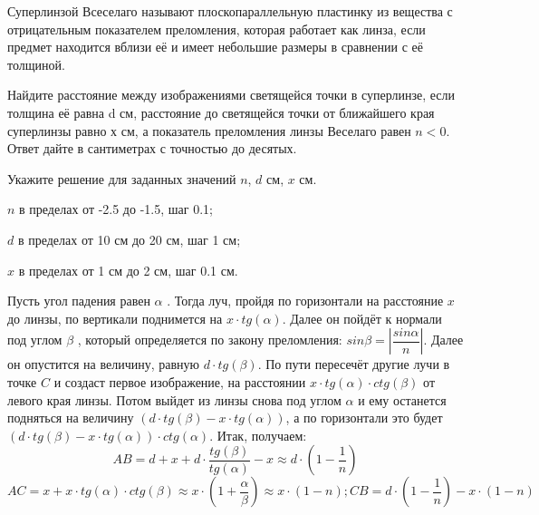 Суперлинзой Всеселаго называют плоскопараллельную
пластинку из вещества с отрицательным показателем преломления, которая работает
как линза, если предмет находится вблизи её и имеет небольшие размеры в
сравнении с её толщиной.

Найдите расстояние между изображениями светящейся
точки в суперлинзе, если толщина её равна d см, расстояние до светящейся точки  от ближайшего края суперлинзы равно х см, а показатель преломления линзы Веселаго равен $n < 0$. Ответ дайте в сантиметрах с точностью до десятых.

Укажите решение для заданных значений $n$, $d$ см, $x$ см.

\paramSection

$n$ в пределах от -2.5 до -1.5, шаг 0.1;    

$d$ в пределах от 10 см до 20 см, шаг 1 см;  

$x$ в пределах от 1 см до 2 см, шаг 0.1 см.

\soultionSection

Пусть угол падения равен $\alpha$ . Тогда луч, пройдя по горизонтали на расстояние $x$ до линзы, 
по вертикали поднимется на $x \cdot tg(\alpha )$. Далее он пойдёт к нормали под углом  $\beta$ , который 
определяется по закону преломления: $sin\beta =\left|\dfrac{sin\alpha}{n}\right|$. Далее он опустится на 
величину, равную $d \cdot  tg( \beta )$. По пути пересечёт другие лучи в точке $C$ и создаст первое изображение,  
на расстоянии  $x \cdot tg(\alpha ) \cdot ctg( \beta )$  от левого края линзы. Потом выйдет из линзы снова под 
углом $\alpha$  и ему останется подняться на величину $(d \cdot  tg( \beta ) - x \cdot tg(\alpha ) )$, а по 
горизонтали это будет $(d \cdot  tg( \beta ) - x \cdot tg(\alpha )) \cdot ctg(\alpha )$. Итак, получаем:  
$$AB=d+x+d \cdot \dfrac{tg( \beta )}{tg(\alpha )}-x \approx d \cdot \left(1-\dfrac{1}{n}\right)$$
$AC=x+x \cdot tg(\alpha ) \cdot ctg( \beta ) \approx x \cdot \left(1+\dfrac{\alpha}{\beta} \right) \approx x 
\cdot (1-n);  CB=d \cdot \left(1-\dfrac{1}{n}\right)-x \cdot (1-n)$


